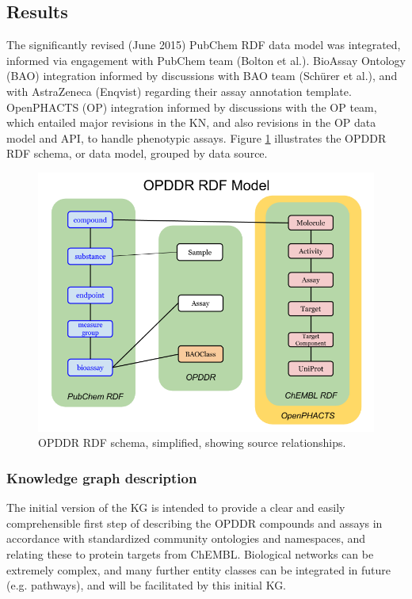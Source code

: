 \subsection{Results}

The significantly revised (June 2015) PubChem RDF data model was integrated, informed via engagement with PubChem team (Bolton et al.). BioAssay Ontology (BAO) integration informed by discussions with BAO team (Sch\"urer et al.), and with AstraZeneca (Enqvist) regarding their assay annotation template. OpenPHACTS (OP) integration informed by discussions with the OP team, which entailed major revisions in the KN, and also revisions in the OP data model and API, to handle phenotypic assays. Figure \ref{fig:opddr_01} illustrates the OPDDR RDF schema, or data model, grouped by data source.

\begin{figure}
    \centering
    \includegraphics[width=\linewidth]{figures/opddr/OPDDR_schema.png}
    \caption{OPDDR RDF schema, simplified, showing source relationships.}
    \label{fig:opddr_01}
\end{figure}

\subsubsection{Knowledge graph description}

The initial version of the KG is intended to provide a clear and easily comprehensible first step of describing the OPDDR compounds and assays in accordance with standardized community ontologies and namespaces, and relating these to protein targets from ChEMBL.  Biological networks can be extremely complex, and many further entity classes can be integrated in future (e.g. pathways), and will be facilitated by this initial KG.

